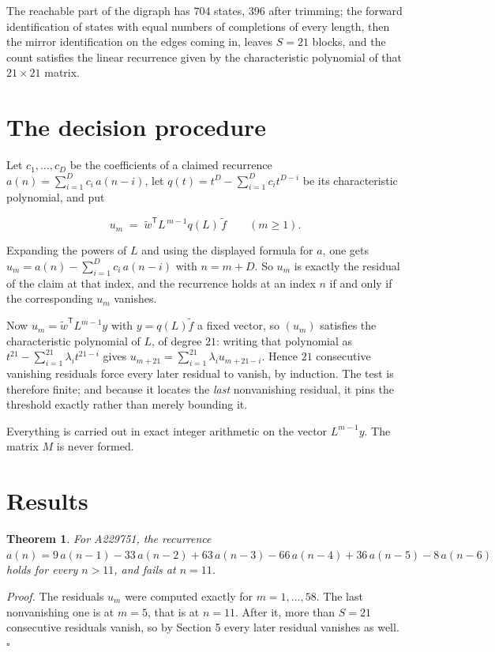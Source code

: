 \documentclass[11pt]{article}
\newtheorem{theorem}{Theorem}
\theoremstyle{definition}
\begin{document}
The reachable part of the digraph has $704$ states, $396$ after trimming; the forward identification of states with equal numbers of completions of every length, then the mirror identification on the edges coming in, leaves $S = 21$ blocks, and the count satisfies the linear recurrence given by the characteristic polynomial of that $21\times21$ matrix.

\section{The decision procedure}

Let $c_1,\dots,c_D$ be the coefficients of a claimed recurrence $a(n) = \sum_{i=1}^{D} c_i\,a(n-i)$, let $q(t) = t^{D} - \sum_{i=1}^{D} c_i t^{D-i}$ be its characteristic polynomial, and put

\[u_m \;=\; \tilde w^{\mathsf T} L^{\,m-1} q(L)\,\tilde f \qquad (m \ge 1).\]

Expanding the powers of $L$ and using the displayed formula for $a$, one gets $u_m = a(n) - \sum_{i=1}^{D} c_i\,a(n-i)$ with $n = m + D$. So $u_m$ is exactly the residual of the claim at that index, and the recurrence holds at an index $n$ if and only if the corresponding $u_m$ vanishes.

Now $u_m = \tilde w^{\mathsf T} L^{m-1} y$ with $y = q(L)\tilde f$ a fixed vector, so $(u_m)$ satisfies the characteristic polynomial of $L$, of degree $21$: writing that polynomial as $t^{21} - \sum_{i=1}^{21} \lambda_i t^{21-i}$ gives $u_{m+21} = \sum_{i=1}^{21} \lambda_i u_{m+21-i}$. Hence $21$ consecutive vanishing residuals force every later residual to vanish, by induction. The test is therefore finite; and because it locates the {\itshape last} nonvanishing residual, it pins the threshold exactly rather than merely bounding it.

Everything is carried out in exact integer arithmetic on the vector $L^{m-1}y$. The matrix $M$ is never formed.

\section{Results}

\begin{theorem} For A229751, the recurrence $a(n) = 9\,a(n-1) - 33\,a(n-2) + 63\,a(n-3) - 66\,a(n-4) + 36\,a(n-5) - 8\,a(n-6)$ holds for every $n > 11$, and fails at $n = 11$.\end{theorem}

{\itshape Proof.} The residuals $u_m$ were computed exactly for $m = 1,\dots,58$. The last nonvanishing one is at $m = 5$, that is at $n = 11$. After it, more than $S = 21$ consecutive residuals vanish, so by Section 5 every later residual vanishes as well. $\square$
\end{document}
